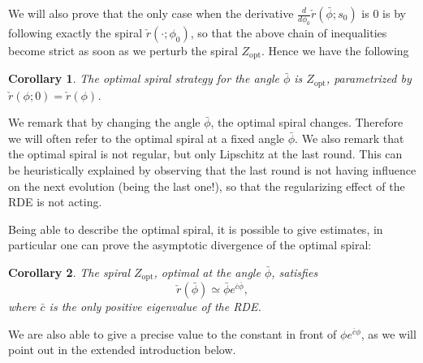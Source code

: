 \documentclass[reqno]{amsart}
\theoremstyle{definition} \newtheorem{definition}{Definition}[section]
\theoremstyle{definition} \newtheorem{remark}[definition]{Remark}
\theoremstyle{plain} \newtheorem{lemma}[definition]{Lemma}
\theoremstyle{plain} \newtheorem{proposition}[definition]{Proposition}
\theoremstyle{plain} \newtheorem{theorem}[definition]{Theorem}
\theoremstyle{plain} \newtheorem{corollary}[definition]{Corollary}
\theoremstyle{definition} \newtheorem{example}[definition]{Example}
\theoremstyle{plain} \newtheorem{claim}[clai]{Claim}
\theoremstyle{definition} \newtheorem{assumption}[definition]{Assumption}
\theoremstyle{definition} \newtheorem{observation}[definition]{Observation}
\newcommand{\1}{\mathbbm 1}
\numberwithin{equation}{section} %
\theoremstyle{plain} \newtheorem*{theorem*}{Theorem}
\theoremstyle{plain} \newtheorem{mthm}[maintheorem]{Main Theorem}
\theoremstyle{plain} \newtheorem*{mthm*}{Main Theorem}
\theoremstyle{plain} \newtheorem*{conjecture*}{Conjecture}
\theoremstyle{plain} \newtheorem{conjecture}[definition]{Conjecture}
\theoremstyle{plain} \newtheorem*{problem*}{Problem}
\begin{document}
We will also prove that the only case when the derivative $\frac{d}{d\phi_0} \check r(\bar \phi;s_0)$ is $0$ is by following exactly the spiral $\check r(\cdot;\phi_0)$, so that the above chain of inequalities become strict as soon as we perturb the spiral $Z_{\text{opt}}$. Hence we have the following

\begin{corollary}
\label{Cor:uniqueness}
The optimal spiral strategy for the angle $\bar \phi$ is $Z_{\text{opt}}$, parametrized by $\check r(\phi;0) = \check r(\phi)$.
\end{corollary}

We remark that by changing the angle $\bar \phi$, the optimal spiral changes. Therefore we will often refer to the optimal spiral at a fixed angle $\bar\phi$. We also remark that the optimal spiral is not regular, but only Lipschitz at the last round. This can be heuristically explained by observing that the last round is not having influence on the next evolution (being the last one!), so that the regularizing effect of the RDE is not acting.

Being able to describe the optimal spiral, it is possible to give estimates, in particular one can prove the asymptotic divergence of the optimal spiral:

\begin{corollary}
\label{Cor:divergence}
The spiral $Z_{\text{opt}}$, optimal at the angle $\bar \phi$, satisfies
\begin{equation*}
\check r(\bar \phi) \simeq \bar \phi e^{\bar c \bar \phi},
\end{equation*}
where $\bar c$ is the only positive eigenvalue of the RDE.
\end{corollary}

We are also able to give a precise value to the constant in front of $\phi e^{\bar c \phi}$, as we will point out in the extended introduction below.


\end{document}
